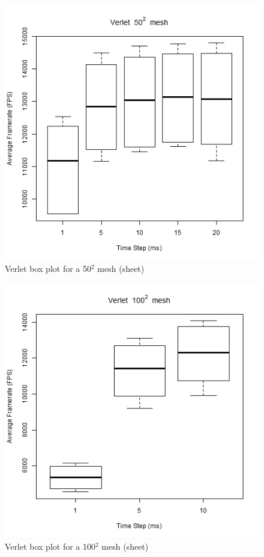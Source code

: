     \begin{figure}
    \begin{center}
      \includegraphics[scale=.9]{Figures/sheet_v_50_box}
    \end{center}
    \caption{Verlet box plot for a 50$^{2}$ mesh (sheet)}
    \label{fig:v box 50 sheet}
  \end{figure}
  
      \begin{figure}
    \begin{center}
      \includegraphics[scale=.9]{Figures/sheet_v_100_box}
    \end{center}
    \caption{Verlet box plot for a 100$^{2}$ mesh (sheet)}
    \label{fig:v box 100 sheet}
  \end{figure}
  
